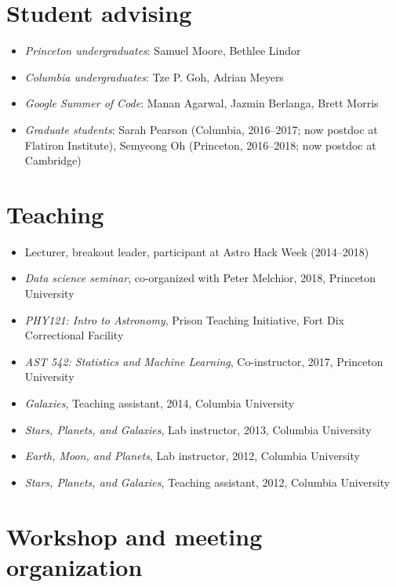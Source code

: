 \documentclass[12pt, letterpaper]{apw-cv}
\begin{document}
\section*{Student advising}

\begin{itemize}
    \item \textit{Princeton undergraduates}: Samuel Moore, Bethlee Lindor
    \item \textit{Columbia undergraduates}: Tze P. Goh, Adrian Meyers
    \item \textit{Google Summer of Code}: Manan Agarwal, Jazmin Berlanga, Brett Morris
    \item \textit{Graduate students}: Sarah Pearson (Columbia, 2016--2017; now postdoc at Flatiron Institute), Semyeong Oh (Princeton, 2016--2018; now postdoc at Cambridge)
\end{itemize}

\section*{Teaching}

\begin{itemize}
    \item Lecturer, breakout leader, participant at Astro Hack Week (2014--2018)
    \item \emph{Data science seminar}, co-organized with Peter Melchior, 2018, Princeton University
    \item \emph{PHY121: Intro to Astronomy}, Prison Teaching Initiative, Fort Dix Correctional Facility
	\item \emph{AST 542: Statistics and Machine Learning}, Co-instructor, 2017, Princeton University
    \item \emph{Galaxies}, Teaching assistant, 2014, Columbia University
	\item \emph{Stars, Planets, and Galaxies}, Lab instructor, 2013, Columbia University
	\item \emph{Earth, Moon, and Planets}, Lab instructor, 2012, Columbia University
	\item \emph{Stars, Planets, and Galaxies}, Teaching assistant, 2012, Columbia University
\end{itemize}

\section*{Workshop and meeting organization}
\end{document}
